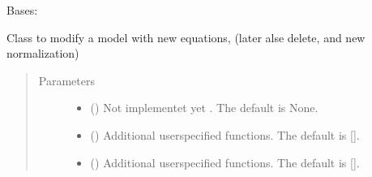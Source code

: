 \documentclass[letterpaper,10pt,english]{sphinxmanual}
\begin{document}
\begin{fulllineitems}
\label{\detokenize{core/modelclass:modelclass.Modify_Mixin}}
\pysigstartsignatures
{}
\pysigstopsignatures
\sphinxAtStartPar
Bases: 

\sphinxAtStartPar
Class to modify a model with new equations, (later alse delete, and new normalization)

\begin{fulllineitems}
\label{\detokenize{core/modelclass:modelclass.Modify_Mixin.eqflip}}
\pysigstartsignatures
{}
\pysigstopsignatures\begin{quote}\begin{description}
\item[{Parameters}] \leavevmode\begin{itemize}
\item {} 
\sphinxAtStartPar
{} (\sphinxstyleliteralemphasis{\sphinxupquote{, }}) \textendash{} Not implementet yet . The default is None.

\item {} 
\sphinxAtStartPar
{} (\sphinxstyleliteralemphasis{\sphinxupquote{, }}) \textendash{} Additional userspecified functions. The default is {[}{]}.

\item {} 
\sphinxAtStartPar
{} (\sphinxstyleliteralemphasis{\sphinxupquote{, }}) \textendash{} Additional userspecified functions. The default is {[}{]}.


\end{itemize}
\end{description}
\end{quote}
\end{fulllineitems}
\end{fulllineitems}
\end{document}
